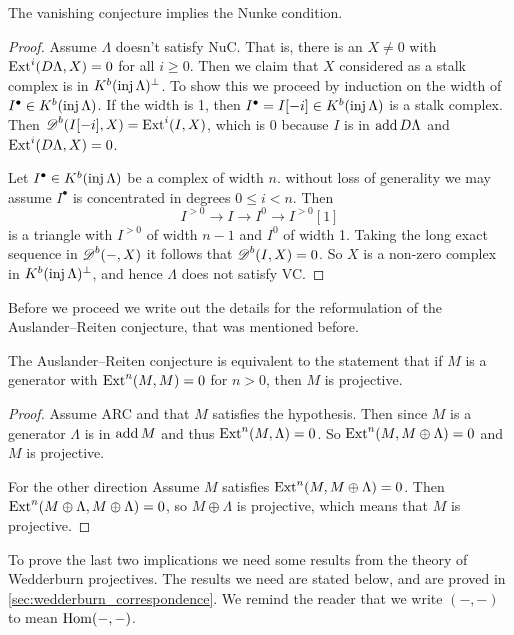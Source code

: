 \begin{theorem} \cite[1.2]{Hap93} \label{thm:VC_implies_Nuc}
	The vanishing conjecture implies the Nunke condition.
	\begin{proof}
		Assume $\Lambda$ doesn't satisfy NuC. That is, there is an $X \neq 0$ with $\operatorname{Ext}^i(D\Lambda, X) = 0$ for all $i \geq 0$. Then we claim that $X$ considered as a stalk complex is in $K^b(\operatorname{inj}\Lambda)^\perp$. To show this we proceed by induction on the width of $I^\bullet \in K^b(\operatorname{inj}\Lambda)$. If the width is 1, then $I^\bullet = I[-i] \in K^b(\operatorname{inj}\Lambda)$ is a stalk complex. Then $\operatorname{\mathscr{D}}^b(I[-i], X) = \operatorname{Ext}^i(I, X)$, which is 0 because $I$ is in $\operatorname{add} D\Lambda$ and $\operatorname{Ext}^i(D\Lambda, X)=0$.
		
		Let $I^\bullet \in K^b(\operatorname{inj}\Lambda)$ be a complex of width $n$. without loss of generality we may assume $I^\bullet$ is concentrated in degrees $0 \leq i < n$. Then 
		$$I^{>0} \to I \to I^{0} \to I^{>0}[1]$$ 
		is a triangle with $I^{>0}$ of width $n-1$ and $I^0$ of width 1. Taking the long exact sequence in $\operatorname{\mathscr{D}}^b(-,X)$ it follows that $\operatorname{\mathscr{D}}^b(I, X)=0$. So $X$ is a non-zero complex in $K^b(\operatorname{inj}\Lambda)^\perp$, and hence $\Lambda$ does not satisfy VC.
	\end{proof}
\end{theorem}

Before we proceed we write out the details for the reformulation of the Auslander--Reiten conjecture, that was mentioned before. 

\begin{prop}\label{prop:ARC_reformulated}
	The Auslander--Reiten conjecture is equivalent to the statement that if $M$ is a generator with $\operatorname{Ext}^n(M, M) = 0$ for $n > 0$, then $M$ is projective.
	\begin{proof}
		Assume ARC and that $M$ satisfies the hypothesis. Then since $M$ is a generator $\Lambda$ is in $\operatorname{add} M$ and thus $\operatorname{Ext}^n(M, \Lambda)=0$. So $\operatorname{Ext}^n(M, M\oplus \Lambda)=0$ and $M$ is projective.
		
		For the other direction Assume $M$ satisfies $\operatorname{Ext}^n(M, M \oplus \Lambda)=0$. Then $\operatorname{Ext}^n(M \oplus \Lambda, M\oplus \Lambda) = 0$, so $M \oplus \Lambda$ is projective, which means that $M$ is projective. 
	\end{proof}
\end{prop}

To prove the last two implications we need some results from the theory of Wedderburn projectives. The results we need are stated below, and are proved in \cref{sec:wedderburn_correspondence}. We remind the reader that we write $(-,-)$ to mean $\operatorname{Hom}(-,-)$.

